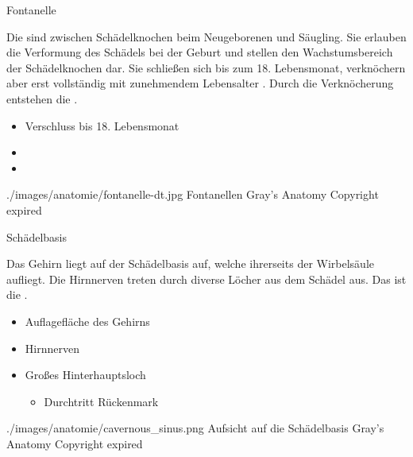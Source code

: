 \TextSlidePicture
{Fontanelle}%
{%
Die  sind  zwischen 
Schädelknochen beim Neu\-geborenen
und Säugling.
%
Sie erlauben die Verformung des Schädels bei der Geburt 
und stellen den Wachstumsbereich der Schädelknochen dar.
%
Sie schließen sich bis zum 18. Lebensmonat, 
verknöchern  aber erst vollständig mit zunehmendem  Lebensalter 
.
%
Durch die Verknöcherung entstehen die  
.

}%
{
\begin{itemize}
  \item Verschluss bis 18. Lebensmonat
  \item {}
  \item {}
\end{itemize}}%
{./images/anatomie/fontanelle-dt.jpg}%
{Fontanellen}%
{}%
{Gray's Anatomy}%
{Copyright expired}%



\TextSlidePicture
{Schädelbasis}%
{%
Das Gehirn liegt auf der Schädelbasis  auf, 
welche ihrerseits der Wirbelsäule aufliegt. 
%
Die Hirnnerven treten durch diverse Löcher aus dem Schädel aus. 
%
Das  
 ist die .

\bigskip

\bigskip

\bigskip

}%
{
\begin{itemize}
  \item Auflagefläche des Gehirns
  \item Hirnnerven
  \item Großes Hinterhauptsloch 
  \begin{itemize}
    \item Durchtritt Rückenmark
  \end{itemize}

\end{itemize}}%
{./images/anatomie/cavernous_sinus.png}%
{Aufsicht auf die Schädelbasis}%
{}%
{Gray's Anatomy}%
{Copyright expired}%


